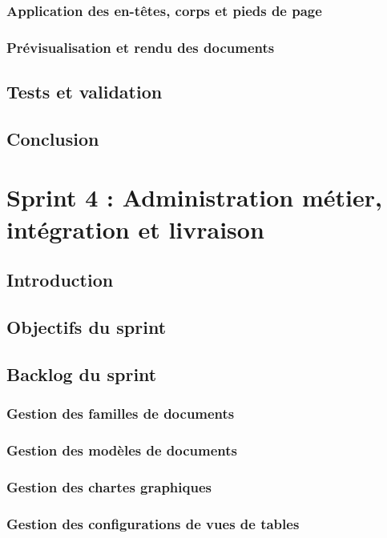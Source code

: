 \documentclass[12pt,a4paper]{report}
\begin{document}
\subsection{Application des en-têtes, corps et pieds de page}
\subsection{Prévisualisation et rendu des documents}
\section{Tests et validation}
\section{Conclusion}


\chapter{Sprint 4 : Administration métier, intégration et livraison}

\section{Introduction}
\section{Objectifs du sprint}
\section{Backlog du sprint}
\subsection{Gestion des familles de documents}
\subsection{Gestion des modèles de documents}
\subsection{Gestion des chartes graphiques}
\subsection{Gestion des configurations de vues de tables}
\end{document}
